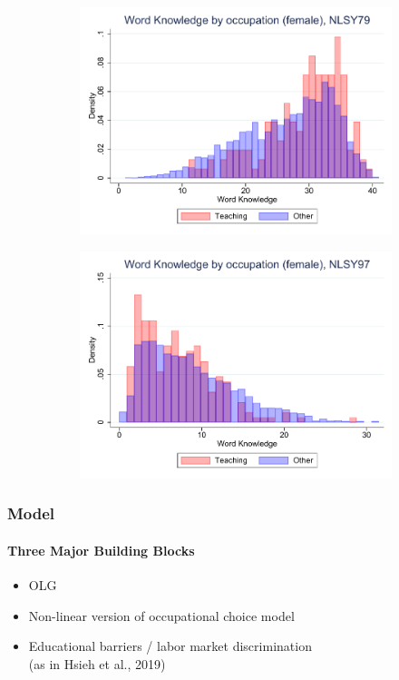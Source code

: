 \documentclass[11pt]{beamer}
\begin{document}
\begin{frame}
\begin{adjustwidth}{2em}{2em}
\begin{figure}[ht!]
\begin{subfigure}[b]{0.27\textwidth}
					\includegraphics[width=\textwidth]{plots/nlsy79_wk_occ_no_norm_female_no_lf.pdf}
				\end{subfigure}
				\hfill
				\begin{subfigure}[b]{0.27\textwidth}
					\centering
					\includegraphics[width=\textwidth]{plots/nlsy97_wk_occ_no_norm_female_no_lf.pdf}
				\end{subfigure}	
			\end{figure}
			\vfill
		\end{adjustwidth}
	\end{frame}
	
	\begin{frame}
		\frametitle{Model}
		\framesubtitle{Three Major Building Blocks}
		\begin{itemize}
			\item OLG
			\item Non-linear version of occupational choice model
			\item Educational barriers / labor market discrimination \\
			(as in Hsieh et al., 2019)
		\end{itemize}
	\end{frame}
	
\end{document}
